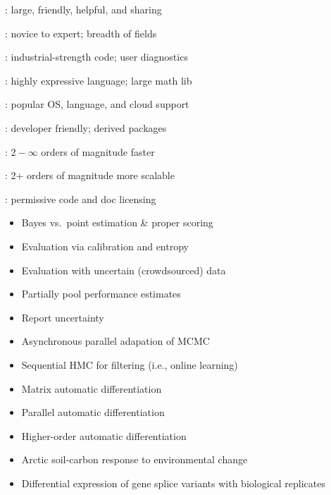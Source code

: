 \documentclass[10pt]{report}
\begin{document}
\begin{subitemize}
\item {}: large, friendly, helpful, and sharing
\item {}:  novice to expert; breadth of fields
\item {}:  industrial-strength code; user diagnostics
\item {}:  highly expressive language;  large math lib
\item {}: popular OS, language, and cloud support
\item {}: developer friendly; derived packages
\item {}:  $2-\infty$ orders of magnitude faster
\item {}:  2+ orders of magnitude more scalable
\item {}: permissive code and doc licensing
\end{subitemize}


\begin{itemize}
\item Bayes vs.\ point estimation \& proper scoring
\item Evaluation via calibration and entropy
\item Evaluation with uncertain (crowdsourced) data
\item Partially pool performance estimates
\item Report uncertainty
\end{itemize}

\begin{itemize}
\item Asynchronous parallel adapation of MCMC
\item Sequential HMC for filtering (i.e., online learning)
\item Matrix automatic differentiation
\item Parallel automatic differentiation
\item Higher-order automatic differentiation
\end{itemize}

\begin{itemize}
\item Arctic soil-carbon response to environmental change
\item Differential expression of gene splice variants with biological replicates
\end{itemize}
\end{document}
